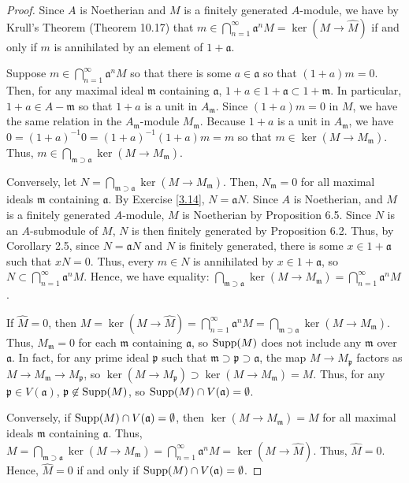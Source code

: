 \begin{proof}
Since $A$ is Noetherian and $M$ is a finitely generated $A$-module, we have by Krull's Theorem (Theorem 10.17) that $m \in \bigcap_{n=1}^{\infty} \mathfrak{a}^n M
= \ker(M \to \hat M)$ if and only if $m$ is annihilated by an element of $1 + \mathfrak{a}$.

Suppose $m \in \bigcap_{n=1}^{\infty} \mathfrak{a}^n M$ so that there is some $a \in \mathfrak{a}$
so that $(1 + a)m = 0$. Then, for any maximal ideal $\mathfrak{m}$ containing $\mathfrak{a}$, $1 + a \in 1 + \mathfrak{a} \subset 1 + \mathfrak{m}$. In particular, 
$1 + a \in A - \mathfrak{m}$ so that $1 + a$ is a unit in $A_{\mathfrak{m}}$. Since $(1+a)m = 0$ in $M$, we have the same relation in the $A_{\mathfrak{m}}$-module 
$M_{\mathfrak{m}}$. Because $1 + a$ is a unit in $A_{\mathfrak{m}}$, we have $0 = (1+a)^{-1}0 = (1+a)^{-1}(1+a)m = m$ so that $m \in \ker(M \to M_{\mathfrak{m}})$. Thus,
$m \in \bigcap_{\mathfrak{m} \supset \mathfrak{a}}\ker(M \to M_{\mathfrak{m}})$.

Conversely, let $N = \bigcap_{\mathfrak{m} \supset \mathfrak{a}}\ker(M \to M_{\mathfrak{m}})$. Then, $N_{\mathfrak{m}} = 0$ for all maximal ideals $\mathfrak{m}$
containing $\mathfrak{a}$. By Exercise \ref{3.14}, $N = \mathfrak{a}N$. Since $A$ is Noetherian, and $M$ is a finitely generated $A$-module, $M$ is Noetherian
by Proposition 6.5. Since $N$ is an $A$-submodule of $M$, $N$ is then finitely generated by Proposition 6.2. Thus, by Corollary 2.5, since $N = \mathfrak{a}N$ and
$N$ is finitely generated, there is some $x \in 1 + \mathfrak{a}$ such that $xN = 0$. Thus, every $m \in N$ is annihilated by $x \in 1 + \mathfrak{a}$, so 
$N \subset \bigcap_{n=1}^{\infty} \mathfrak{a}^n M$. Hence, we have equality:
$\bigcap_{\mathfrak{m} \supset \mathfrak{a}}\ker(M \to M_{\mathfrak{m}}) = \bigcap_{n=1}^{\infty} \mathfrak{a}^n M$.

If $\hat M = 0$, then $M = \ker(M \to \hat M) = \bigcap_{n=1}^{\infty} \mathfrak{a}^n M = \bigcap_{\mathfrak{m} \supset \mathfrak{a}}\ker(M \to M_{\mathfrak{m}})$. 
Thus, $M_{\mathfrak{m}} = 0$ for each $\mathfrak{m}$ containing $\mathfrak{a}$, so $\operatorname{Supp}(M)$ does not include
any $\mathfrak{m}$ over $\mathfrak{a}$. In fact, for any prime ideal $\mathfrak{p}$ such that $\mathfrak{m} \supset \mathfrak{p} \supset \mathfrak{a}$, the map
$M \to M_{\mathfrak{p}}$ factors as $M \to M_{\mathfrak{m}} \to M_{\mathfrak{p}}$, so $\ker(M \to M_{\mathfrak{p}}) \supset \ker(M \to M_{\mathfrak{m}}) = M$. Thus,
for any $\mathfrak{p} \in V(\mathfrak{a})$, $\mathfrak{p} \not\in \operatorname{Supp}(M)$, so $\operatorname{Supp}(M) \cap V(\mathfrak{a}) = \emptyset$.

Conversely, if $\operatorname{Supp}(M) \cap V(\mathfrak{a}) = \emptyset$, then $\ker(M \to M_{\mathfrak{m}}) = M$ for all maximal ideals $\mathfrak{m}$ containing $\mathfrak{a}$.
Thus, $M = \bigcap_{\mathfrak{m} \supset \mathfrak{a}}\ker(M \to M_{\mathfrak{m}}) = \bigcap_{n=1}^{\infty} \mathfrak{a}^n M = \ker(M \to \hat M)$. Thus, $\hat M = 0$.
Hence, $\hat M = 0$ if and only if $\operatorname{Supp}(M) \cap V(\mathfrak{a}) = \emptyset$.
\end{proof}

